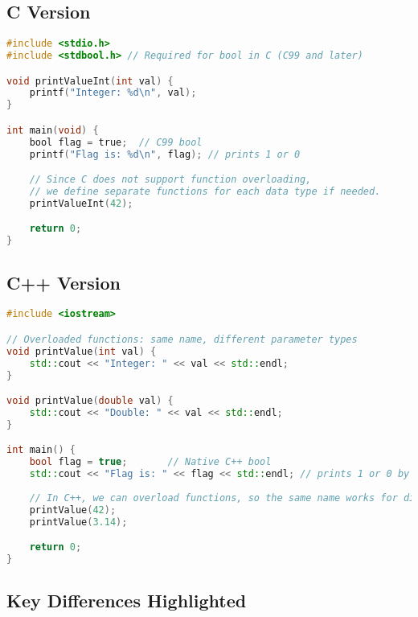 \documentclass[a4paper,12pt]{article}
\begin{document}
\subsection*{C Version}
\begin{lstlisting}[language=C, caption={C example using stdbool.h and printf}]
#include <stdio.h>
#include <stdbool.h> // Required for bool in C (C99 and later)

void printValueInt(int val) {
    printf("Integer: %d\n", val);
}

int main(void) {
    bool flag = true;  // C99 bool
    printf("Flag is: %d\n", flag); // prints 1 or 0

    // Since C does not support function overloading,
    // we define separate functions for each data type if needed.
    printValueInt(42);

    return 0;
}
\end{lstlisting}

\subsection*{C++ Version}
\begin{lstlisting}[language=C++, caption={C++ example using native bool, function overloading, and iostream}]
#include <iostream>

// Overloaded functions: same name, different parameter types
void printValue(int val) {
    std::cout << "Integer: " << val << std::endl;
}

void printValue(double val) {
    std::cout << "Double: " << val << std::endl;
}

int main() {
    bool flag = true;       // Native C++ bool
    std::cout << "Flag is: " << flag << std::endl; // prints 1 or 0 by default
    
    // In C++, we can overload functions, so the same name works for different types.
    printValue(42);
    printValue(3.14);

    return 0;
}
\end{lstlisting}

\newpage

\subsection*{Key Differences Highlighted}
\end{document}
